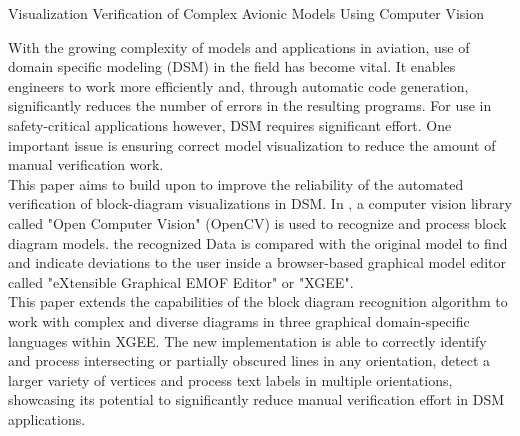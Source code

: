 \label{abstract}
{\LARGE Visualization Verification of Complex Avionic Models Using Computer Vision}

With the growing complexity of models and applications in aviation, use of domain specific modeling (DSM) in the field has become vital. It enables engineers to work more efficiently and, through automatic code generation, significantly reduces the number of errors in the resulting programs. For use in safety-critical applications however, DSM requires significant effort. One important issue is ensuring correct model visualization to reduce the amount of manual verification work.\\
This paper aims to build upon \cite{ar_prof_paper} to improve the reliability of the automated verification of block-diagram visualizations in DSM. In \cite{ar_prof_paper}, a computer vision library called "Open Computer Vision" (OpenCV) is used to recognize and process block diagram models. the recognized Data is compared with the original model to find and indicate deviations to the user inside a browser-based graphical model editor called "eXtensible Graphical EMOF Editor" or "XGEE".\\
This paper extends the capabilities of the block diagram recognition algorithm to work with complex and diverse diagrams in three graphical domain-specific languages within XGEE. The new implementation is able to correctly identify and process intersecting or partially obscured lines in any orientation, detect a larger variety of vertices and process text labels in multiple orientations, showcasing its potential to significantly reduce manual verification effort in DSM applications.